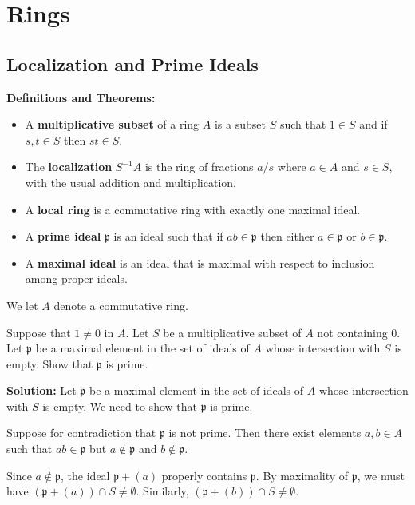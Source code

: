 \chapter{Rings}

\section{Localization and Prime Ideals}

\noindent\textbf{Definitions and Theorems:}
\begin{itemize}
\item A \textbf{multiplicative subset} of a ring $A$ is a subset $S$ such that $1 \in S$ and if $s, t \in S$ then $st \in S$.
\item The \textbf{localization} $S^{-1}A$ is the ring of fractions $a/s$ where $a \in A$ and $s \in S$, with the usual addition and multiplication.
\item A \textbf{local ring} is a commutative ring with exactly one maximal ideal.
\item A \textbf{prime ideal} $\mathfrak{p}$ is an ideal such that if $ab \in \mathfrak{p}$ then either $a \in \mathfrak{p}$ or $b \in \mathfrak{p}$.
\item A \textbf{maximal ideal} is an ideal that is maximal with respect to inclusion among proper ideals.
\end{itemize}

We let $A$ denote a commutative ring.

\begin{problembox}
Suppose that $1 \neq 0$ in $A$. Let $S$ be a multiplicative subset of $A$ not containing $0$. Let $\mathfrak{p}$ be a maximal element in the set of ideals of $A$ whose intersection with $S$ is empty. Show that $\mathfrak{p}$ is prime.
\end{problembox}

\noindent\textbf{Solution:}
Let $\mathfrak{p}$ be a maximal element in the set of ideals of $A$ whose intersection with $S$ is empty. We need to show that $\mathfrak{p}$ is prime.

Suppose for contradiction that $\mathfrak{p}$ is not prime. Then there exist elements $a, b \in A$ such that $ab \in \mathfrak{p}$ but $a \notin \mathfrak{p}$ and $b \notin \mathfrak{p}$.

Since $a \notin \mathfrak{p}$, the ideal $\mathfrak{p} + (a)$ properly contains $\mathfrak{p}$. By maximality of $\mathfrak{p}$, we must have $(\mathfrak{p} + (a)) \cap S \neq \emptyset$. Similarly, $(\mathfrak{p} + (b)) \cap S \neq \emptyset$.

